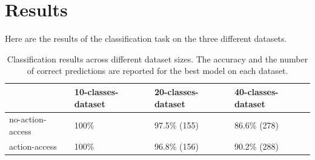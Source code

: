 \documentclass[11pt,a4paper]{article}
\begin{document}
\section{Results}
Here are the results of the classification task on the three different datasets.

\begin{table}[h!]
    \centering
    \begin{tabularx}{\textwidth}{lXXX}
        \toprule
        & \textbf{10-classes-dataset} & \textbf{20-classes-dataset} & \textbf{40-classes-dataset} \\
        \midrule
        no-action-access & 100\% & 97.5\% (155) & 86.6\% (278) \\
        action-access & 100\% & 96.8\% (156) & 90.2\% (288) \\
        \bottomrule
    \end{tabularx}
    \caption{Classification results across different dataset sizes. The accuracy and the number of correct predictions are reported for the best model on each dataset.}
    \label{tab:results}
\end{table}




\end{document}
